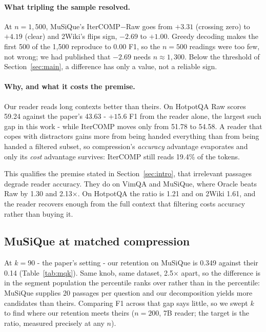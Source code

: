 \documentclass[11pt]{article}
\begin{document}
\paragraph{What tripling the sample resolved.} At $n=1{,}500$, MuSiQue's
IterCOMP$-$Raw goes from $+3.31$ (crossing zero) to $+4.19$ (clear) and 2Wiki's
flips sign, $-2.69$ to $+1.00$. Greedy decoding makes the first 500 of the 1,500
reproduce to $0.00$ F1, so the $n=500$ readings were too few, not wrong; we had
published that $-2.69$ needs $n\approx1{,}300$. Below the threshold of
Section~\ref{sec:main}, a difference has only a value, not a reliable sign.

\paragraph{Why, and what it costs the premise.} Our reader reads long contexts
better than theirs. On HotpotQA Raw scores 59.24 against the paper's 43.63 -
$+15.6$ F1 from the reader alone, the largest such gap in this work - while
IterCOMP moves only from 51.78 to 54.58. A reader that copes with distractors
gains more from being handed everything than from being handed a filtered
subset, so compression's \emph{accuracy} advantage evaporates and only its
\emph{cost} advantage survives: IterCOMP still reads 19.4\% of the tokens.

This qualifies the premise stated in Section~\ref{sec:intro}, that irrelevant
passages degrade reader accuracy. They do on VimQA and MuSiQue, where Oracle
beats Raw by 1.30 and 2.13$\times$. On HotpotQA the ratio is 1.21 and on 2Wiki
1.61, and the reader recovers enough from the full context that filtering costs
accuracy rather than buying it.

\subsection{MuSiQue at matched compression}
\label{app:mqk}

At $k=90$ - the paper's setting - our retention on MuSiQue is 0.349 against
their 0.14 (Table~\ref{tab:mqk}). Same knob, same dataset, 2.5$\times$ apart, so the difference is in
the segment population the percentile ranks over rather than in the percentile:
MuSiQue supplies 20 passages per question and our decomposition yields more
candidates than theirs. Comparing F1 across that gap says little, so we swept
$k$ to find where our retention meets theirs ($n=200$, 7B reader; the target is
the ratio, measured precisely at any $n$).
\end{document}
